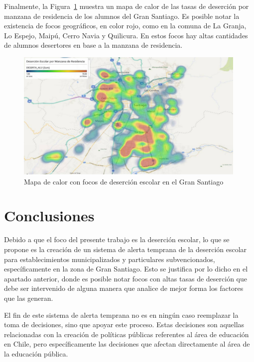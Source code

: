 \newpage

Finalmente, la Figura~\ref{fig:mapacalor} muestra un mapa de calor de las tasas de deserción por manzana de residencia de los alumnos del Gran Santiago. Es posible notar la existencia de focos geográficos, en color rojo, como en la comuna de La Granja, Lo Espejo, Maipú, Cerro Navia y Quilicura. En estos focos hay altas cantidades de alumnos desertores en base a la manzana de residencia. 

\begin{figure}[H]
  \centering
    \includegraphics[width=0.99\textwidth]{Figuras/MapaCalor}
      \caption{Mapa de calor con focos de deserción escolar en el Gran Santiago}
    \label{fig:mapacalor}
\end{figure}

\section{Conclusiones}

Debido a que el foco del presente trabajo es la deserción escolar, lo que se propone es la creación de un sistema de alerta temprana de la deserción escolar para establecimientos municipalizados y particulares subvencionados, específicamente en la zona de Gran Santiago. Esto se justifica por lo dicho en el apartado anterior, donde es posible notar focos con altas tasas de deserción que debe ser intervenido de alguna manera que analice de mejor forma los factores que las generan. 

El fin de este sistema de alerta temprana no es en ningún caso reemplazar la toma de decisiones, sino que apoyar este proceso. Estas decisiones son aquellas relacionadas con la creación de políticas públicas referentes al área de educación en Chile, pero específicamente las decisiones que afectan directamente al área de la educación pública. 

